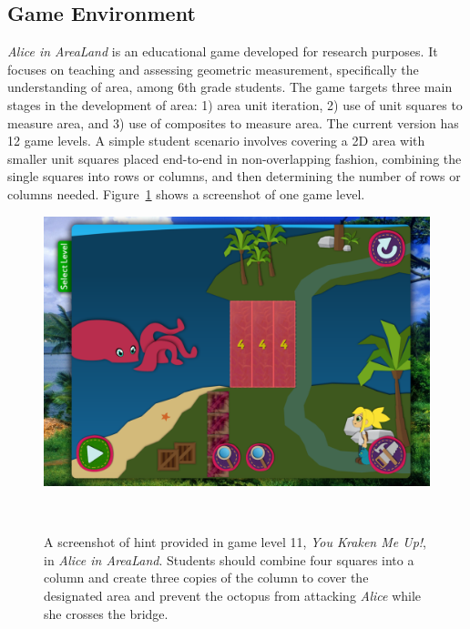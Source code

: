 \documentclass{sigchi}
\begin{document}
\subsection{Game Environment}
\textit {Alice in AreaLand} is an educational game developed for research purposes. It focuses on teaching and assessing geometric measurement, specifically the understanding of area, among 6th grade students. The game targets three main stages in the development of area: 1) area unit iteration, 2) use of unit squares to measure area, and 3) use of composites to measure area. The current version has 12 game levels. A simple student scenario involves covering a 2D area with smaller unit squares placed end-to-end in non-overlapping fashion, combining the single squares into rows or columns, and then determining the number of rows or columns needed. Figure~\ref{fig:figurekracken} shows a screenshot of one game level.

\begin{figure}
	\centering
	\includegraphics[width=0.9\columnwidth]{figures/kracken}
	\caption{A screenshot of hint provided in game level 11, \textit {You Kraken Me Up!}, in \textit {Alice in AreaLand}. Students should combine four squares into a column and create three copies of the column to cover the designated area and prevent the octopus from attacking \textit {Alice} while she crosses the bridge.}~\label{fig:figurekracken}
\end{figure}
\end{document}
